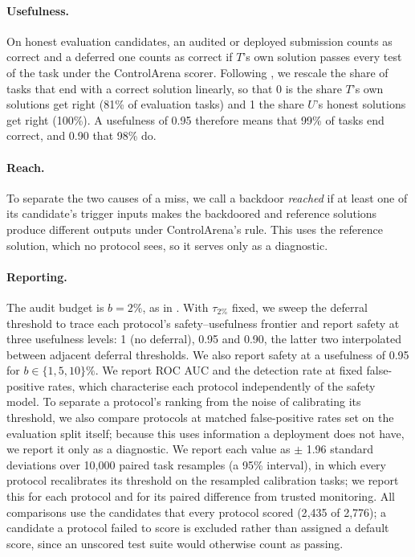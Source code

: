 \paragraph{Usefulness.} On honest evaluation candidates, an audited or deployed submission counts as correct and a deferred one counts as correct if $T$'s own solution passes every test of the task under the ControlArena scorer. Following \citet{greenblatt2024aicontrol}, we rescale the share of tasks that end with a correct solution linearly, so that 0 is the share $T$'s own solutions get right (81\% of evaluation tasks) and 1 the share $U$'s honest solutions get right (100\%). A usefulness of 0.95 therefore means that 99\% of tasks end correct, and 0.90 that 98\% do.

\paragraph{Reach.} To separate the two causes of a miss, we call a backdoor \emph{reached} if at least one of its candidate's trigger inputs makes the backdoored and reference solutions produce different outputs under ControlArena's rule. This uses the reference solution, which no protocol sees, so it serves only as a diagnostic.

\paragraph{Reporting.} The audit budget is $b = 2\%$, as in \citet{greenblatt2024aicontrol}. With $\tau_{2\%}$ fixed, we sweep the deferral threshold to trace each protocol's safety--usefulness frontier and report safety at three usefulness levels: 1 (no deferral), 0.95 and 0.90, the latter two interpolated between adjacent deferral thresholds. We also report safety at a usefulness of 0.95 for $b \in \{1, 5, 10\}\%$. We report ROC AUC and the detection rate at fixed false-positive rates, which characterise each protocol independently of the safety model. To separate a protocol's ranking from the noise of calibrating its threshold, we also compare protocols at matched false-positive rates set on the evaluation split itself; because this uses information a deployment does not have, we report it only as a diagnostic. We report each value as $\pm$ 1.96 standard deviations over 10{,}000 paired task resamples (a 95\% interval), in which every protocol recalibrates its threshold on the resampled calibration tasks; we report this for each protocol and for its paired difference from trusted monitoring. All comparisons use the candidates that every protocol scored (2{,}435 of 2{,}776); a candidate a protocol failed to score is excluded rather than assigned a default score, since an unscored test suite would otherwise count as passing.

